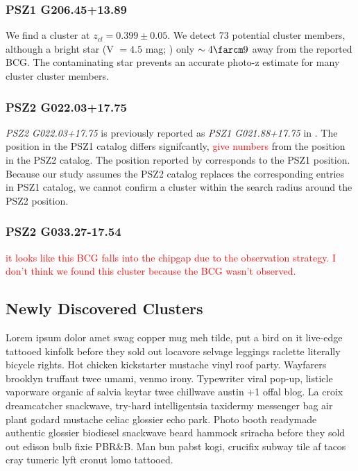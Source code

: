 \documentclass[apj, revtex4]{emulateapj}
\newcommand{\editorial}[1]{\textcolor{red}{#1}}
\begin{document}
\subsubsection{PSZ1 G206.45+13.89}
We find a cluster at $z_{cl} = 0.399 \pm 0.05$. We detect 73 potential cluster members, although a bright star (V $= 4.5$ mag; \citealt{Hog2000}) only $\sim4\farcm9$ away from the reported BCG. The contaminating star prevents an accurate photo-z estimate for many cluster cluster members.

\subsubsection{PSZ2 G022.03+17.75}

\textit{PSZ2 G022.03+17.75} is previously reported as \textit{PSZ1 G021.88+17.75} in \cite{PlanckCollaboration2014}. The position in the PSZ1 catalog differs signifcantly, \editorial{give numbers} from the position in the PSZ2 catalog. The position reported by \cite{Barrena2018} corresponds to the PSZ1 position. Because our study assumes the PSZ2 catalog replaces the corresponding entries in PSZ1 catalog, we cannot confirm a cluster within the search radius around the PSZ2 position.

\subsubsection{PSZ2 G033.27-17.54}
\editorial{it looks like this BCG falls into the chipgap due to the observation strategy. I don't think we found this cluster because the BCG wasn't observed.}


\subsection{Newly Discovered Clusters}


Lorem ipsum dolor amet swag copper mug meh tilde, put a bird on it live-edge tattooed kinfolk before they sold out locavore selvage leggings raclette literally bicycle rights. Hot chicken kickstarter mustache vinyl roof party. Wayfarers brooklyn truffaut twee umami, venmo irony. Typewriter viral pop-up, listicle vaporware organic af salvia keytar twee chillwave austin +1 offal blog. La croix dreamcatcher snackwave, try-hard intelligentsia taxidermy messenger bag air plant godard mustache celiac glossier echo park. Photo booth readymade authentic glossier biodiesel snackwave beard hammock sriracha before they sold out edison bulb fixie PBR\&B. Man bun pabst kogi, crucifix subway tile af tacos cray tumeric lyft cronut lomo tattooed.
\end{document}
